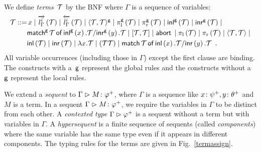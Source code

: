 We define \textit{terms}~$\term$ by the BNF
where $\Gamma$ is a sequence of variables:
\begin{align*}
\term ::=&\,
 x\mid \ltor i l \Gamma \term \mid \rtol i l \Gamma \term \mid
 \gpair {\term,\term}\mid
 \gpil \term \mid \gpir \term \mid
 \ginl\term \mid
 \ginr\term \mid \\ & \gmat \term x\term y \term \mid 
 \cotuple{\term,\term} \mid \abort \mid
  \lpil \term \mid \lpir \term \mid
 \lpair {\term,\term}\mid \\&
  \linl \term \mid  \linr \term \mid
 \lambda x.\term\mid (\term \term)
\mid \lmat \term x\term y \term \enspace.
\end{align*}
All variable occurrences (including those in $\Gamma$)
except the first clause are
binding.
The constructs with a~$\g$ represent the global rules and the
constructs without a~$\g$ represent the local rules.

We extend a \textit{sequent}
to $\Gamma\tr \tj M{\m \varphi}$, where $\Gamma$ is
a sequence like $\tj{x}{\m\psi}, \tj{y}{\m\theta}$ and $M$ is a term.
In a sequent $\Gamma\tr\tj{M}{\m\varphi}$, we require the variables in
$\Gamma$ to be distinct from each other.
A \textit{contexted type}
 $\Gamma\tr\m\varphi$ is a sequent without a term but with variables in
 $\Gamma$.
A \textit{hypersequent} is a finite sequence of sequents (called
\textit{components})
where the same
variable has the same type even if it appears in different components.
The typing rules for the terms are given in Fig.~\ref{termassign}.

